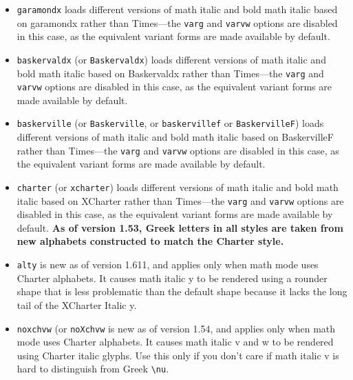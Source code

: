 \documentclass[11pt]{article}
\theoremstyle{oldplain}
\theoremstyle{plain}
\begin{document}
\begin{itemize}
\item {\tt garamondx} loads different versions of math italic and bold math italic based on \textsf{garamondx} rather than \textsf{Times}---the {\tt varg} and {\tt varvw} options are disabled in this case, as the equivalent variant forms are made available by default.
\item {\tt baskervaldx} (or {\tt Baskervaldx}) loads different versions of math italic and bold math italic based on \textsf{Baskervaldx} rather than \textsf{Times}---the {\tt varg} and {\tt varvw} options are disabled in this case, as the equivalent variant forms are made available by default.
\item {\tt baskerville} (or {\tt Baskerville}, or {\tt baskervillef} or {\tt BaskervilleF}) loads different versions of math italic and bold math italic based on \textsf{BaskervilleF} rather than \textsf{Times}---the {\tt varg} and {\tt varvw} options are disabled in this case, as the equivalent variant forms are made available by default.
\item {\tt charter} (or {\tt xcharter}) loads different versions of math italic and bold math italic based on \textsf{XCharter} rather than \textsf{Times}---the {\tt varg} and {\tt varvw} options are disabled in this case, as the equivalent variant forms are made available by default. \textbf{As of version 1.53, Greek letters in all styles are taken from  new alphabets constructed to match the Charter style.}
\item {\tt alty}  is new as of version 1.611, and applies only when math mode uses Charter alphabets. It causes math italic y to be rendered using a rounder shape that is less problematic than the default shape because it lacks the long tail of the XCharter Italic {y}.
\item {\tt noxchvw} (or {\tt noXchvw} is new as of version 1.54, and applies only when math mode uses Charter alphabets. It causes math italic v and w to be rendered using Charter italic glyphs. Use this only if you don't care if math italic v is hard to distinguish from Greek \verb|\nu|.


\end{itemize}
\end{document}
